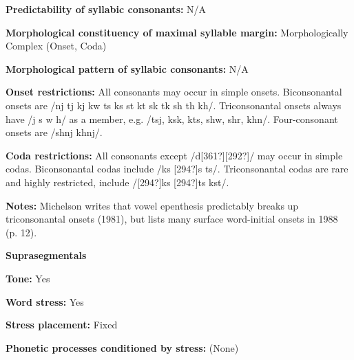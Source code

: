 \begin{styleBody}
\textbf{Predictability of syllabic consonants:} N/A
\end{styleBody}

\begin{styleBody}
\textbf{Morphological constituency of maximal syllable margin:} Morphologically Complex (Onset, Coda)
\end{styleBody}

\begin{styleBody}
\textbf{Morphological pattern of syllabic consonants:} N/A
\end{styleBody}

\begin{styleBody}
\textbf{Onset restrictions: }All consonants may occur in simple onsets. Biconsonantal onsets are /nj tj kj kw ts ks st kt sk tk sh th kh/. Triconsonantal onsets always have /j s w h/ as a member, e.g. /tsj, ksk, kts, shw, shr, khn/. Four-consonant onsets are /shnj khnj/.
\end{styleBody}

\begin{styleBody}
\textbf{Coda restrictions: }All consonants except /d[361?][292?]/ may occur in simple codas. Biconsonantal codas include /ks [294?]s ts/. Triconsonantal codas are rare and highly restricted, include /[294?]ks [294?]ts kst/.
\end{styleBody}

\begin{styleBody}
\textbf{Notes: }Michelson writes that vowel epenthesis predictably breaks up triconsonantal onsets (1981), but lists many surface word-initial onsets in 1988 (p. 12).
\end{styleBody}

\begin{styleBody}
\textbf{Suprasegmentals}
\end{styleBody}

\begin{styleBody}
\textbf{Tone:} Yes
\end{styleBody}

\begin{styleBody}
\textbf{Word stress:} Yes
\end{styleBody}

\begin{styleBody}
\textbf{Stress placement:} Fixed
\end{styleBody}

\begin{styleBody}
\textbf{Phonetic processes conditioned by stress:} (None)
\end{styleBody}

